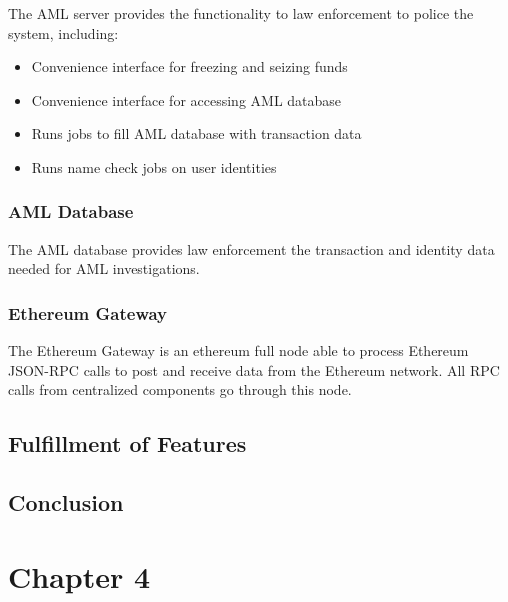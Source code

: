 \documentclass[a4paper,12pt]{article} %
\begin{document}
{The AML server provides the functionality to law enforcement to police the system, including:

\begin{itemize}
	\item Convenience interface for freezing and seizing funds
	\item Convenience interface for accessing AML database
	\item Runs jobs to fill AML database with transaction data
	\item Runs name check jobs on user identities
\end{itemize}

\subsubsection{AML Database} \label{sssec:3.5:amlDatabase}

The AML database provides law enforcement the transaction and identity data needed for AML investigations.

\subsubsection{Ethereum Gateway} \label{sssec:3.5:ethereumGateway}

The Ethereum Gateway is an ethereum full node able to process Ethereum JSON-RPC calls to post and receive data from the Ethereum network\cite{ethereumJsonRpc}. All RPC calls from centralized components go through this node.

\subsection{Fulfillment of Features} \label{ssec:3.6}


\subsection{Conclusion} \label{ssec:3.7}


\pagebreak

\section{Chapter 4} \label{sec:4}

}
\end{document}
